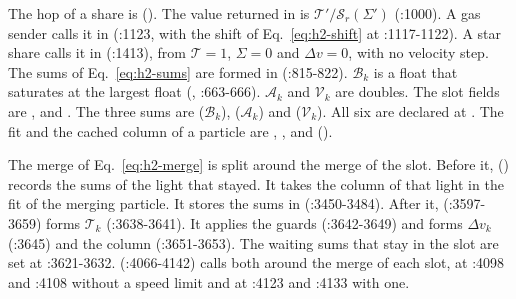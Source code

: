 The hop of a share is 
(). The value returned in  is
$\mathcal T'/\mathcal S_r(\Sigma')$ (:1000). A gas sender calls it in
 (:1123, with the shift of
Eq.~\eqref{eq:h2-shift} at :1117-1122). A star share calls it in
 (:1413), from $\mathcal T=1$, $\Sigma=0$ and
$\Delta v=0$, with no velocity step. The sums of Eq.~\eqref{eq:h2-sums} are
formed in  (:815-822).
$\mathcal B_k$ is a float that saturates at the largest float
(, :663-666). $\mathcal A_k$ and
$\mathcal V_k$ are doubles. The slot fields are ,
 and . The three sums are
 ($\mathcal B_k$),
 ($\mathcal A_k$) and
 ($\mathcal V_k$). All six are declared at
. The fit and the cached column of a particle
are , ,
 and 
().

The merge of Eq.~\eqref{eq:h2-merge} is split around the merge of the slot.
Before it, 
() records the sums of the light that
stayed. It takes the column of that light in the fit of the merging particle.
It stores the sums in 
(:3450-3484). After it,  (:3597-3659) forms
$\mathcal T_k$ (:3638-3641). It applies the guards (:3642-3649) and forms
$\Delta v_k$ (:3645) and the column (:3651-3653). The waiting sums that stay in
the slot are set at :3621-3632.
 (:4066-4142) calls both around the merge of each
slot, at :4098 and :4108 without a speed limit and at :4123 and :4133 with one.

